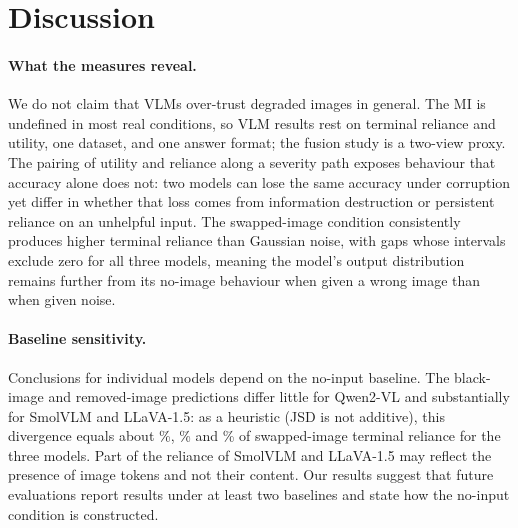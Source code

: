 \section{Discussion}
\label{sec:discussion}

\paragraph{What the measures reveal.}
We do not claim that VLMs over-trust degraded images in general. The MI is
undefined in most real conditions, so VLM results rest on terminal
reliance and utility, one dataset, and one answer format; the fusion study
is a two-view proxy. The pairing of utility and reliance along a severity
path exposes behaviour that accuracy alone does not: two models can lose the
same accuracy under corruption yet differ in whether that loss comes from
information destruction or persistent reliance on an unhelpful input.
The swapped-image condition consistently produces higher terminal reliance
than Gaussian noise, with gaps whose intervals exclude zero for all three
models, meaning the model's output distribution remains further from its
no-image behaviour when given a wrong image than when given noise.

\paragraph{Baseline sensitivity.}
Conclusions for individual models depend on the no-input baseline. The
black-image and removed-image predictions differ little for Qwen2-VL and
substantially for SmolVLM and LLaVA-1.5: as a heuristic (JSD is not
additive), this divergence equals about
\%,
\% and
\% of swapped-image terminal
reliance for the three models. Part of the reliance of SmolVLM and
LLaVA-1.5 may reflect the presence of image tokens and not their content.
Our results suggest that future evaluations report results under at least two
baselines and state how the no-input condition is constructed.

